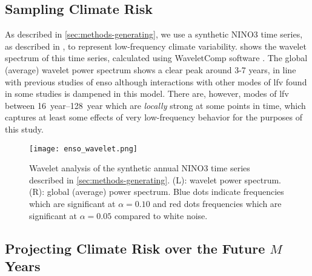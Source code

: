 \documentclass[
]{agujournal2018}
\begin{document}
\subsection{Sampling Climate Risk}\label{sec:supp-nino-spectrum}

As described in \cref{sec:methods-generating}, we use a synthetic NINO3 time series, as described in \citep{Ramesh:2016hf}, to represent low-frequency climate variability.
 shows the wavelet spectrum of this time series, calculated using WaveletComp software \citep{Roesch:wlBQQoIs}.
The global (average) wavelet power spectrum shows a clear peak around 3-7 years, in line with previous studies of \gls{enso} although interactions with other modes of \acrfull{lfv} found in some studies \citep{Jin:1994wq} is dampened in this model.
There are, however, modes of \gls{lfv} between \SIrange{16}{128}{year} which are \emph{locally} strong at some points in time, which captures at least some effects of very low-frequency behavior for the purposes of this study.
\begin{figure}
  \texttt{[image: enso\_wavelet.png]}
  \caption{
    Wavelet analysis of the synthetic annual NINO3 time series described in \cref{sec:methods-generating}.
    (L): wavelet power spectrum.
    (R): global (average) power spectrum.
    Blue dots indicate frequencies which are significant at $\alpha=0.10$ and red dots frequencies which are significant at $\alpha=0.05$ compared to white noise.
  }\label{fig:enso-ts}
\end{figure}

\subsection{Projecting Climate Risk over the Future $M$ Years}
\end{document}

